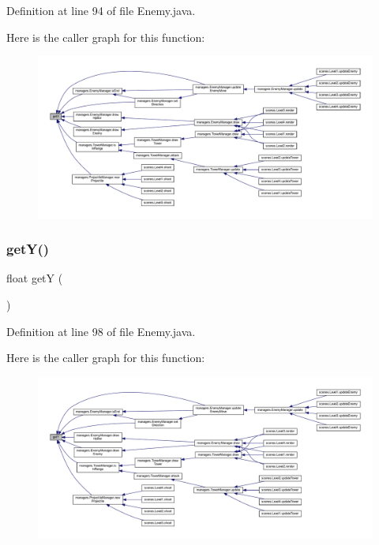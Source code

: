 Definition at line 94 of file Enemy.\+java.

Here is the caller graph for this function\+:\nopagebreak
\begin{figure}[H]
\begin{center}
\leavevmode
\includegraphics[width=350pt]{classenemies_1_1_enemy_ae8f033a71b96920114aee202798dc7e9_icgraph}
\end{center}
\end{figure}
\mbox{\label{classenemies_1_1_enemy_aa0f539cec219900ff6cf76edcfa52367}} 
\subsubsection{\texorpdfstring{get\+Y()}{getY()}}
{\footnotesize\ttfamily float getY (\begin{DoxyParamCaption}{ }\end{DoxyParamCaption})}



Definition at line 98 of file Enemy.\+java.

Here is the caller graph for this function\+:\nopagebreak
\begin{figure}[H]
\begin{center}
\leavevmode
\includegraphics[width=350pt]{classenemies_1_1_enemy_aa0f539cec219900ff6cf76edcfa52367_icgraph}
\end{center}
\end{figure}
\mbox{\label{classenemies_1_1_enemy_ab63593ba1faf08d9f9d69e1ec33c3caf}} 
